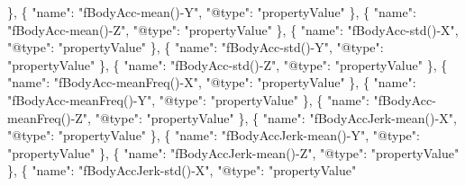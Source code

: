 \documentclass[
]{article}
\newenvironment{Shaded}{\begin{snugshade}}{\end{snugshade}}
\newcommand{\DataTypeTok}[1]{\textcolor[rgb]{0.13,0.29,0.53}{#1}}
\newcommand{\FunctionTok}[1]{\textcolor[rgb]{0.00,0.00,0.00}{#1}}
\newcommand{\OtherTok}[1]{\textcolor[rgb]{0.56,0.35,0.01}{#1}}
\newcommand{\StringTok}[1]{\textcolor[rgb]{0.31,0.60,0.02}{#1}}
\begin{document}
\begin{Shaded}
\begin{Highlighting}[]
    \FunctionTok{\}}\OtherTok{,}
    \FunctionTok{\{}
      \DataTypeTok{"name"}\FunctionTok{:} \StringTok{"fBodyAcc{-}mean(){-}Y"}\FunctionTok{,}
      \DataTypeTok{"@type"}\FunctionTok{:} \StringTok{"propertyValue"}
    \FunctionTok{\}}\OtherTok{,}
    \FunctionTok{\{}
      \DataTypeTok{"name"}\FunctionTok{:} \StringTok{"fBodyAcc{-}mean(){-}Z"}\FunctionTok{,}
      \DataTypeTok{"@type"}\FunctionTok{:} \StringTok{"propertyValue"}
    \FunctionTok{\}}\OtherTok{,}
    \FunctionTok{\{}
      \DataTypeTok{"name"}\FunctionTok{:} \StringTok{"fBodyAcc{-}std(){-}X"}\FunctionTok{,}
      \DataTypeTok{"@type"}\FunctionTok{:} \StringTok{"propertyValue"}
    \FunctionTok{\}}\OtherTok{,}
    \FunctionTok{\{}
      \DataTypeTok{"name"}\FunctionTok{:} \StringTok{"fBodyAcc{-}std(){-}Y"}\FunctionTok{,}
      \DataTypeTok{"@type"}\FunctionTok{:} \StringTok{"propertyValue"}
    \FunctionTok{\}}\OtherTok{,}
    \FunctionTok{\{}
      \DataTypeTok{"name"}\FunctionTok{:} \StringTok{"fBodyAcc{-}std(){-}Z"}\FunctionTok{,}
      \DataTypeTok{"@type"}\FunctionTok{:} \StringTok{"propertyValue"}
    \FunctionTok{\}}\OtherTok{,}
    \FunctionTok{\{}
      \DataTypeTok{"name"}\FunctionTok{:} \StringTok{"fBodyAcc{-}meanFreq(){-}X"}\FunctionTok{,}
      \DataTypeTok{"@type"}\FunctionTok{:} \StringTok{"propertyValue"}
    \FunctionTok{\}}\OtherTok{,}
    \FunctionTok{\{}
      \DataTypeTok{"name"}\FunctionTok{:} \StringTok{"fBodyAcc{-}meanFreq(){-}Y"}\FunctionTok{,}
      \DataTypeTok{"@type"}\FunctionTok{:} \StringTok{"propertyValue"}
    \FunctionTok{\}}\OtherTok{,}
    \FunctionTok{\{}
      \DataTypeTok{"name"}\FunctionTok{:} \StringTok{"fBodyAcc{-}meanFreq(){-}Z"}\FunctionTok{,}
      \DataTypeTok{"@type"}\FunctionTok{:} \StringTok{"propertyValue"}
    \FunctionTok{\}}\OtherTok{,}
    \FunctionTok{\{}
      \DataTypeTok{"name"}\FunctionTok{:} \StringTok{"fBodyAccJerk{-}mean(){-}X"}\FunctionTok{,}
      \DataTypeTok{"@type"}\FunctionTok{:} \StringTok{"propertyValue"}
    \FunctionTok{\}}\OtherTok{,}
    \FunctionTok{\{}
      \DataTypeTok{"name"}\FunctionTok{:} \StringTok{"fBodyAccJerk{-}mean(){-}Y"}\FunctionTok{,}
      \DataTypeTok{"@type"}\FunctionTok{:} \StringTok{"propertyValue"}
    \FunctionTok{\}}\OtherTok{,}
    \FunctionTok{\{}
      \DataTypeTok{"name"}\FunctionTok{:} \StringTok{"fBodyAccJerk{-}mean(){-}Z"}\FunctionTok{,}
      \DataTypeTok{"@type"}\FunctionTok{:} \StringTok{"propertyValue"}
    \FunctionTok{\}}\OtherTok{,}
    \FunctionTok{\{}
      \DataTypeTok{"name"}\FunctionTok{:} \StringTok{"fBodyAccJerk{-}std(){-}X"}\FunctionTok{,}
      \DataTypeTok{"@type"}\FunctionTok{:} \StringTok{"propertyValue"}

\end{Highlighting}
\end{Shaded}
\end{document}
